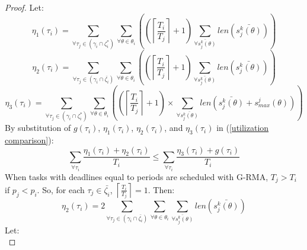 \documentclass[12pt,english]{report}
\newtheorem{proof}{Proof}
\begin{document}
\begin{proof}
Let:
%
\begin{equation*}
\eta_{1}(\tau_{i})=\sum_{\forall\tau_{j}\in(\gamma_{i}\cap\zeta_{i}^{*})}\sum_{\forall\theta\in\theta_{i}}\left(\left(\left\lceil \frac{T_{i}}{T_{j}}\right\rceil +1\right)\sum_{\bar{\forall s_{j}^{k}(\theta)}}len\left(\bar{s_{j}^{k}(\theta)}\right)\right)
\end{equation*}
%
\begin{equation*}
\eta_{2}(\tau_{i})=\sum_{\forall\tau_{j}\in(\gamma_{i}\cap\bar{\zeta_{i}})}\sum_{\forall\theta\in\theta_{i}}\left(\left(\left\lceil \frac{T_{i}}{T_{j}}\right\rceil +1\right)\sum_{\bar{\forall s_{j}^{k}(\theta)}}len\left(\bar{s_{j}^{k}(\theta)}\right)\right)
\end{equation*}
%
%
\begin{equation*}
\eta_{3}(\tau_{i}) = \sum_{\forall\tau_{j}\in(\gamma_{i}\cap\zeta_{i}^{*})}\sum_{\forall\theta\in\theta_{i}}\left(\left(\left\lceil \frac{T_{i}}{T_{j}}\right\rceil +1\right)\times \sum_{\forall\bar{s_{j}^{k}(\theta)}}len\left(\bar{s_{j}^{k}(\theta)}+s_{max}^{j}(\theta)\right)\right)
\end{equation*}
%
By substitution of $g(\tau_i)$, $\eta_1(\tau_i)$, $\eta_2(\tau_i)$, and $\eta_3(\tau_i)$ in (\ref{utilization comparison}):
%
\begin{equation}
\sum_{\forall\tau_{i}}\frac{\eta_{1}(\tau_{i})+\eta_{2}(\tau_{i})}{T_{i}}\le\sum_{\forall\tau_{i}}\frac{\eta_{3}(\tau_{i})+g(\tau_{i})}{T_{i}}
\label{PNF rcm comparison 3}
\end{equation}
%
When tasks with deadlines equal to periods are scheduled with G-RMA, $T_{j}>T_{i}$ if $p_{j}<p_{i}$. So, for each $\tau_{j}\in\bar{\zeta_{i}}$, $\left\lceil \frac{T_{i}}{T_{j}}\right\rceil =1$. Then:
%
\begin{equation}
\eta_{2}(\tau_{i})=2\sum_{\forall\tau_{j}\in(\gamma_{i}\cap\bar{\zeta_{i}})}\sum_{\forall\theta\in\theta_{i}}\sum_{\bar{\forall s_{j}^{k}(\theta)}}len\left(\bar{s_{j}^{k}(\theta)}\right)
\label{PNF rcm comparison 5}
\end{equation}
%
Let:
%
\begin{equation*}

\end{equation*}
\end{proof}
\end{document}
